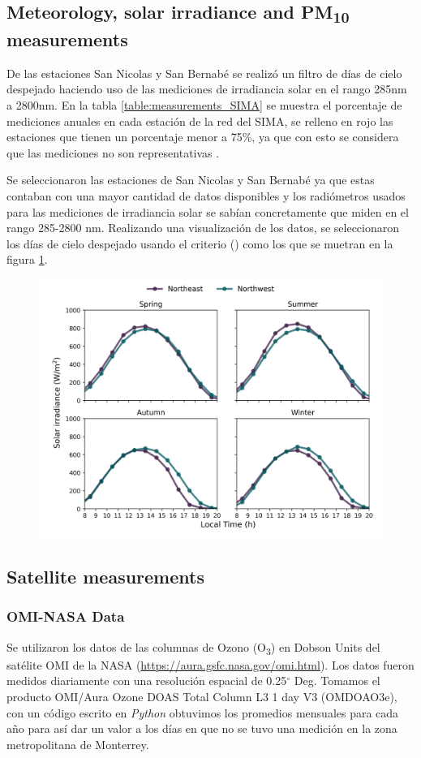 \subsection{Meteorology, solar irradiance and PM\textsubscript{10} measurements}
De las estaciones San Nicolas y San Bernabé se realizó un filtro de días de cielo despejado haciendo uso de las mediciones de irradiancia solar en el rango 285nm a 2800nm. En la tabla \ref{table:measurements_SIMA} se muestra el porcentaje de mediciones anuales en cada estación de la red del SIMA, se relleno en rojo las estaciones que tienen un porcentaje menor a 75\%, ya que con esto se considera que las mediciones no son representativas \cite{molina2019}.

Se seleccionaron las estaciones de San Nicolas y San Bernabé ya que estas contaban con una mayor cantidad de datos disponibles y los radiómetros usados para las mediciones de irradiancia solar se sabían concretamente que miden en el rango 285-2800 nm. Realizando una visualización de los datos, se seleccionaron los días de cielo despejado usando el criterio () como los que se muetran en la figura \ref{fig:clear_days}.
\begin{figure}[H]
    \centering
    \includegraphics[scale=0.5]{images/Clear_days.png}
    \caption{}
    \label{fig:clear_days}
\end{figure}
\subsection{Satellite measurements}
\subsubsection{OMI-NASA Data}
Se utilizaron los datos de las columnas de Ozono (O\textsubscript{3}) en Dobson Units del satélite OMI de la NASA (\url{https://aura.gsfc.nasa.gov/omi.html}). Los datos fueron medidos diariamente con una resolución espacial de 0.25$^{\circ}$ Deg. Tomamos el producto OMI/Aura Ozone DOAS Total Column L3 1 day V3 (OMDOAO3e), con un código escrito en \textit{Python} obtuvimos los promedios mensuales para cada año para así dar un valor a los días en que no se tuvo una medición en la zona metropolitana de Monterrey.
